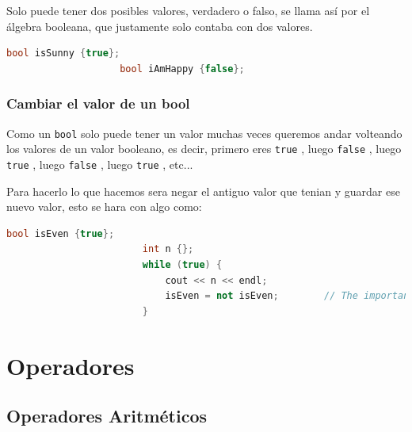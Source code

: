 \documentclass[12pt, fleqn]{report}                             %
\theoremstyle{break}                                            %
\newcommand{\textCode}[1]  { \texttt{#1} }                      %
\begin{document}
                Solo puede tener dos posibles valores, verdadero o falso, se llama así por el álgebra
                booleana, que justamente solo contaba con dos valores.
                \begin{lstlisting}[language=C++, gobble=20]
                    bool isSunny {true};
                    bool iAmHappy {false};
                \end{lstlisting}

                \subsubsection{Cambiar el valor de un bool}

                    Como un \textCode{bool} solo puede tener un valor muchas veces queremos andar volteando
                    los valores de un valor booleano, es decir, primero eres \textCode{true}, luego
                    \textCode{false}, luego \textCode{true}, luego \textCode{false}, luego \textCode{true}, 
                    etc...

                    Para hacerlo lo que hacemos sera negar el antiguo valor que tenian y guardar ese nuevo valor,
                    esto se hara con algo como:
                    \begin{lstlisting}[language=C++, gobble=24]
                        bool isEven {true};
                        int n {};
                        while (true) {
                            cout << n << endl;
                            isEven = not isEven;        // The important line
                        }
                    \end{lstlisting}


        \clearpage
        \section{Operadores}

            \subsection{Operadores Aritméticos}
\end{document}
